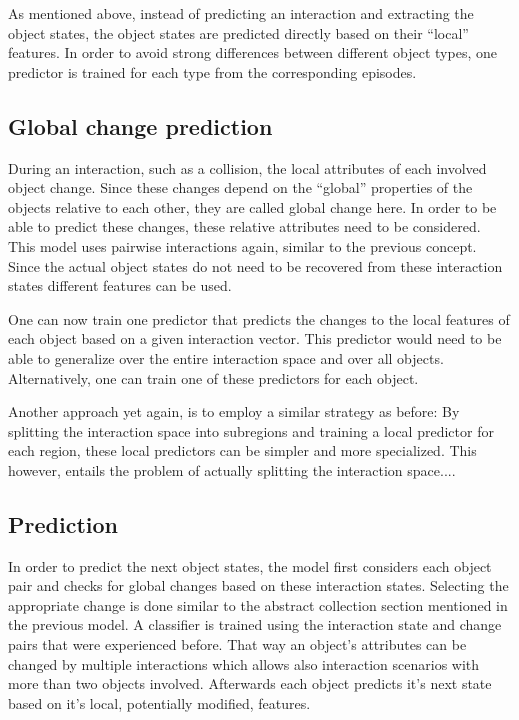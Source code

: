 As mentioned above, instead of predicting an interaction and extracting the 
object states, the object states are predicted directly based on their \enquote{local} features. In order to avoid strong differences between different object types, one predictor is trained for each type from the corresponding episodes. 

\subsection{Global change prediction}

During an interaction, such as a collision, the local attributes of each 
involved object change. Since these changes depend on the \enquote{global} 
properties of the objects relative to each other, they are called global change 
here. 
In order to be able to predict these changes, these relative attributes need to 
be considered. This model uses pairwise interactions again, similar to the 
previous concept. Since the actual object states do not need to be recovered 
from these interaction states different features can be used.

One can now train one predictor that predicts the changes to the local features 
of each object based on a given interaction vector. This predictor would need 
to be able to generalize over the entire interaction space and over all objects.
Alternatively, one can train one of these predictors for each object.

Another approach yet again, is to employ a similar strategy as before:
By splitting the interaction space into subregions and training a local predictor for each region, 
these local predictors can be simpler and more specialized. This however, entails the problem of 
actually splitting the interaction space.... %
 

\subsection{Prediction}

In order to predict the next object states, the model first considers each 
object pair and checks for global changes based on these interaction states.
Selecting the appropriate change is done similar to the abstract collection 
section mentioned in the previous model. A classifier is trained using the 
interaction state and change pairs that were experienced before. 
That way an object's attributes can be changed by multiple interactions which 
allows also interaction scenarios with more than two objects involved. 
Afterwards each object predicts it's next state based on it's local, 
potentially modified, features.

